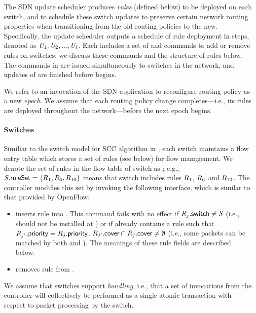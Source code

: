 The SDN update scheduler produces \textit{rules} (defined below) to be
deployed on each switch, and to schedule these switch updates to
preserve certain network routing properties when transitioning from
the old routing policies to the new.  Specifically, the update
scheduler outputs a schedule of rule deployment in \updateSteps steps,
denoted as $\mathit{U}_{1}, \mathit{U}_{2}, ...,
\mathit{U}_{\mathit{\ell}}$. Each \updateID{\updateIdx} includes a set of
\flowAdd and \flowDel commands to add or remove rules on switches; we
discuss these commands and the structure of rules below. The commands
in \updateID{\updateIdx} are issued simultaneously to switches in the
network, and updates of \updateID{\updateIdx} are finished before
 begins.

We refer to an invocation of the SDN application to reconfigure
routing policy as a new \textit{epoch}.  We assume that each routing
policy change completes---i.e., its rules are deployed throughout the
network---before the next epoch begins.

\paragraph{Switches}
Similiar to the switch model for SCC algorithm in , each switch maintains a flow entry table which stores a set of rules
(see below) for flow management.  We denote the set of rules in the
flow table of switch \switchID{} as ; e.g.,
$\switchID{}{\ruleSet} = \{\ruleID{1}, \ruleID{6}, \ruleID{10}\}$
means that switch \switchID{} includes rules $\ruleID{1}$,
$\ruleID{6}$ and $\ruleID{10}$.  The controller modifies this set by
invoking the following interface, which is similar to that provided by
OpenFlow:
\begin{itemize}[nosep,leftmargin=1em,labelwidth=*,align=left]
\item
{} inserts rule
 into .  This command fails with
no effect if $\ruleID{\ruleIdx}{\switchField} \neq \switchID{}$ (i.e.,  should not be installed at \switchID{}) or if
 already contains a rule 
such that $\ruleID{\ruleIdxAlt}{\priorityField} =
\ruleID{\ruleIdx}{\priorityField}$, $\ruleID{\ruleIdxAlt}{\coverField}
\cap \ruleID{\ruleIdx}{\coverField} \neq \emptyset$ (i.e., some packets can be matched by both  and ).  The meanings of
these rule fields are described below.
\item {} removes rule
   from .
\end{itemize}
We assume that switches support \textit{bundling}, i.e., that a set of
invocations from the controller will collectively be performed as a
single atomic transaction with respect to packet processing by the
switch.

